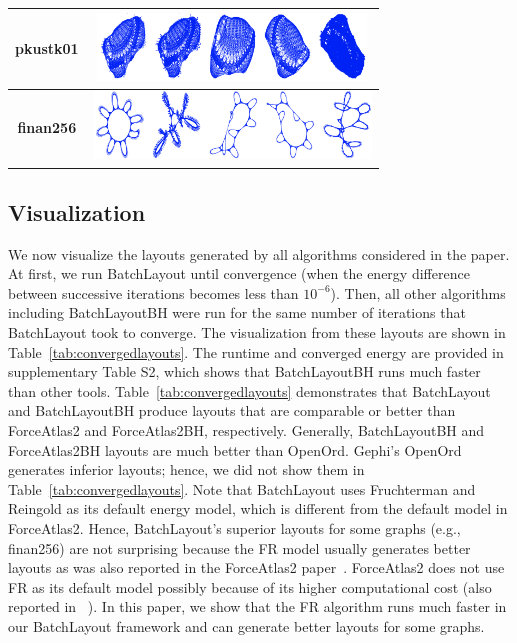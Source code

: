\documentclass{vgtc}
\newcommand{\commentKhaled}[1]{{\color{black}{#1}}}
\newcommand{\toolname}{{BatchLayout}}
\newcommand{\toolnameBH}{{BatchLayoutBH}}
\begin{document}
\begin{table}[!t]
\begin{tabular}{|c|p{2.5cm}|p{2.6cm}|p{2.6cm}|p{2.6cm}|p{2.5cm}|}
\textbf{pkustk01}        & \multicolumn{5}{c|}{\includegraphics[height=1.8cm,width=0.8\linewidth]{layouts/convergedlayouts/pkustk01_converged.png}}  \\ \hline

\textbf{finan256}        & \multicolumn{5}{c|}{\includegraphics[height=1.8cm,width=0.8\linewidth]{layouts/convergedlayouts/finan256_converged.png}}  \\ \hline
\end{tabular}
\vspace{-0.2cm}
\end{table}

\subsection{Visualization}
We now visualize the layouts generated by all algorithms considered in the paper. 
At first, we run \toolname{} until convergence (when the energy difference between successive iterations becomes less than $10^{-6}$).
Then, all other algorithms including \toolnameBH{} were run for the same number of iterations that \toolname{} took to converge.
The visualization from these layouts are shown in Table~\ref{tab:convergedlayouts}.
The runtime and converged energy are provided  in supplementary Table S2, which shows that \toolnameBH{} runs much faster than other tools.
Table~\ref{tab:convergedlayouts} demonstrates that \toolname{} and \toolnameBH{} produce \commentKhaled{readable} layouts that are comparable or better than ForceAtlas2 and ForceAtlas2BH, respectively.
Generally, \toolnameBH{} and ForceAtlas2BH layouts are much better than OpenOrd.
Gephi's OpenOrd generates inferior layouts; hence, we did not show them in Table~\ref{tab:convergedlayouts}.
Note that \toolname{} uses Fruchterman and Reingold as its default energy model, which is different from the default model in ForceAtlas2. 
Hence, \toolname{}'s superior layouts for some graphs (e.g., finan256) are not surprising because the FR model usually generates better layouts as was also reported in the ForceAtlas2 paper~\cite{jacomy2014forceatlas2}.
ForceAtlas2 does not use FR as its default model possibly because of its higher computational cost (also reported in ~\cite{jacomy2014forceatlas2}).
In this paper, we show that the FR algorithm runs much faster in our \toolname{} framework and can generate better layouts for some graphs. 
\end{document}
